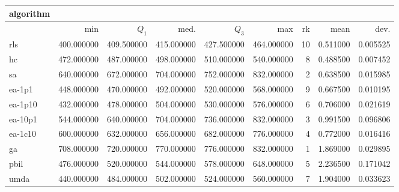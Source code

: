\begin{tabular}{@{}l*{5}{>{{}}N{3}{0}}>{{}}N{2}{0}N{1}{3}N{1}{3}@{}}
\toprule
{algorithm} &  &  \\
\midrule
& {min} & {$Q_1$} & {med.} & {$Q_3$} & {max} & {rk} & {mean} & {dev.} \\
\midrule
rls & 400.000000 & 409.500000 & 415.000000 & 427.500000 & 464.000000 & 10 & 0.511000 & 0.005525 \\
 hc & 472.000000 & 487.000000 & 498.000000 & 510.000000 & 540.000000 & 8 & 0.488500 & 0.007452 \\
 sa & 640.000000 & 672.000000 & 704.000000 & 752.000000 & {\color{blue}} 832.000000 & 2 & 0.638500 & 0.015985 \\
 ea-1p1 & 448.000000 & 470.000000 & 492.000000 & 520.000000 & 568.000000 & 9 & 0.667500 & 0.010195 \\
 ea-1p10 & 432.000000 & 478.000000 & 504.000000 & 530.000000 & 576.000000 & 6 & 0.706000 & 0.021619 \\
 ea-10p1 & 544.000000 & 640.000000 & 704.000000 & 736.000000 & {\color{blue}} 832.000000 & 3 & 0.991500 & 0.096806 \\
 ea-1c10 & 600.000000 & 632.000000 & 656.000000 & 682.000000 & 776.000000 & 4 & 0.772000 & 0.016416 \\
 ga & {\color{blue}} 708.000000 & {\color{blue}} 720.000000 & {\color{blue}} 770.000000 & {\color{blue}} 776.000000 & {\color{blue}} 832.000000 & 1 & 1.869000 & 0.029895 \\
 pbil & 476.000000 & 520.000000 & 544.000000 & 578.000000 & 648.000000 & 5 & 2.236500 & 0.171042 \\
 umda & 440.000000 & 484.000000 & 502.000000 & 524.000000 & 560.000000 & 7 & 1.904000 & 0.033623 \\
 \bottomrule
\end{tabular}
